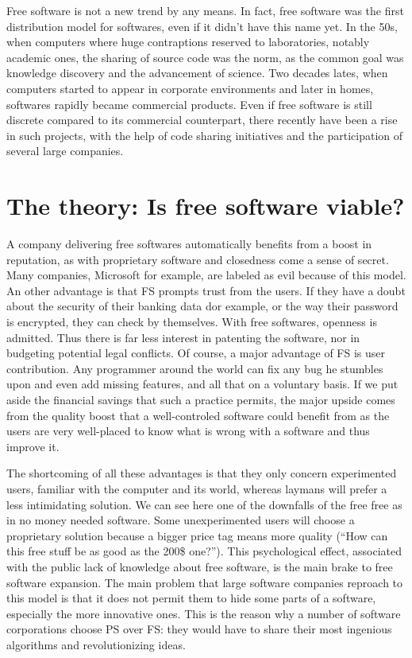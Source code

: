 \documentclass[12pt]{article}
\begin{document}
Free software is not a new trend by any means. In fact, free software
was the first distribution model for softwares, even if it didn't have
this name yet. In the 50s, when computers where huge contraptions
reserved to laboratories, notably academic ones, the sharing of source
code was the norm, as the common goal was knowledge discovery and the
advancement of science. Two decades lates, when computers started to
appear in corporate environments and later in homes, softwares rapidly
became commercial products. Even if free software is still discrete
compared to its commercial counterpart, there recently have been a
rise in such projects, with the help of code sharing initiatives and
the participation of several large companies.

\section{The theory: Is free software viable?}

A company delivering free softwares automatically benefits from a
boost in reputation, as with proprietary software and closedness come
a sense of secret. Many companies, Microsoft for example, are labeled
as evil because of this model. An other advantage is that FS prompts
trust from the users. If they have a doubt about the security of their
banking data dor example, or the way their password is encrypted, they
can check by themselves. With free softwares, openness is
admitted. Thus there is far less interest in patenting the software,
nor in budgeting potential legal conflicts. Of course, a major
advantage of FS is user contribution. Any programmer around the world
can fix any bug he stumbles upon and even add missing features, and
all that on a voluntary basis. If we put aside the financial savings
that such a practice permits, the major upside comes from the quality
boost that a well-controled software could benefit from as the users
are very well-placed to know what is wrong with a software and thus
improve it.

The shortcoming of all these advantages is that they only concern
experimented users, familiar with the computer and its world, whereas
laymans will prefer a less intimidating solution. We can see here one
of the downfalls of the free \textemdash free as in no money needed
\textemdash software. Some unexperimented users will choose a
proprietary solution because a bigger price tag means more quality
(``How can this free stuff be as good as the 200\$ one?''). This
psychological effect, associated with the public lack of knowledge
about free software, is the main brake to free software
expansion. The main problem that large software companies reproach to
this model is that it does not permit them to hide some parts of a
software, especially the more innovative ones. This is the reason why
a number of software corporations choose PS over FS: they would have
to share their most ingenious algorithms and revolutionizing ideas.
\end{document}
